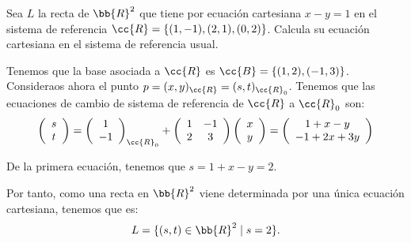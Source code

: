 \begin{ejercicio}
    Sea $L$ la recta de $\bb{R}^2$ que tiene por ecuación cartesiana $x - y = 1$ en el sistema de referencia $\cc{R} = \{(1, -1), (2, 1), (0, 2)\}$. Calcula su ecuación cartesiana en el sistema de referencia usual.

    Tenemos que la base asociada a $\cc{R}$ es $\cc{B}=\{(1,2), (-1, 3)\}$. Consideraos ahora el punto $p=(x,y)_{\cc{R}}=(s,t)_{\cc{R}_0}$. Tenemos que las ecuaciones de cambio de sistema de referencia de $\cc{R}$ a $\cc{R}_0$ son:
    \begin{equation*}
        \left(\begin{array}{c}
            s \\ t
        \end{array}\right)
        = \left(\begin{array}{c}
            1 \\ -1
        \end{array}\right)_{\cc{R}_0} + 
        \left(\begin{array}{cc}
            1 & -1 \\
            2 & 3
        \end{array}\right) \left(\begin{array}{c}
            x \\ y
        \end{array}\right)
        = \left(\begin{array}{c}
            1+x-y \\
            -1+2x+3y
        \end{array}\right)
    \end{equation*}

    De la primera ecuación, tenemos que $s = 1+x-y=2$.

    Por tanto, como una recta en $\bb{R}^2$ viene determinada por una única ecuación cartesiana, tenemos que es:
    \begin{equation*}
        L = \{(s,t)\in \bb{R}^2\mid s=2\}.
    \end{equation*}
\end{ejercicio}

